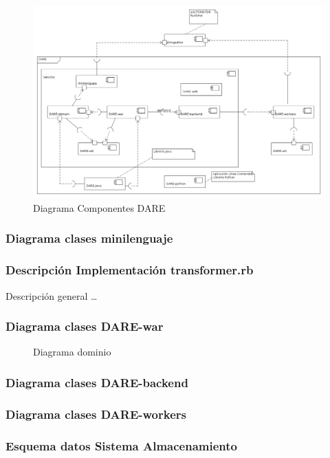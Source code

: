 \begin{landscape}
\begin{figure}[p]
\includegraphics[width=1.4\textwidth]{chapters/technical-manual/diagrams/diagrama_componentes.png}
\caption{Diagrama Componentes DARE}\label{diagrama_componentes_dare}
\end{figure}
\end{landscape}


\subsubsection{Diagrama clases minilenguaje}

\subsubsection{Descripción Implementación transformer.rb}
Descripción general \ldots{}

\subsubsection{Diagrama clases DARE-war}
\begin{figure}[!hbp]
\makebox[\textwidth]{\framebox[5cm]{\rule{0pt}{5cm}}}
\caption{Diagrama dominio}
\end{figure}

\subsubsection{Diagrama clases DARE-backend}
\subsubsection{Diagrama clases DARE-workers}

\subsubsection{Esquema datos Sistema Almacenamiento}
